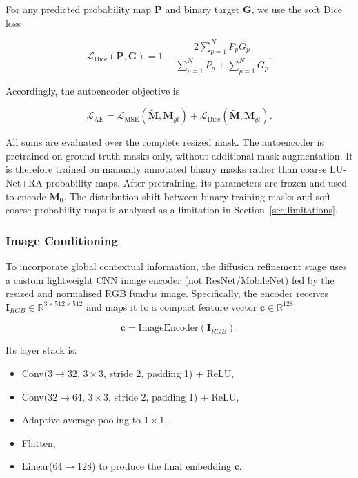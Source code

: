 \documentclass[jimaging,article,submit,pdftex,moreauthors]{Definitions/mdpi}%
\begin{document}
For any predicted probability map $\mathbf{P}$ and binary target $\mathbf{G}$, we use the soft Dice loss

\begin{equation}
\mathcal{L}_{\text{Dice}}(\mathbf{P},\mathbf{G})=
1-\frac{2\sum_{p=1}^{N}P_pG_p}
{\sum_{p=1}^{N}P_p+\sum_{p=1}^{N}G_p}.
\end{equation}

Accordingly, the autoencoder objective is

\begin{equation}
\mathcal{L}_{\text{AE}} =
\mathcal{L}_{\text{MSE}}(\tilde{\mathbf{M}},\mathbf{M}_{gt})+
\mathcal{L}_{\text{Dice}}(\tilde{\mathbf{M}},\mathbf{M}_{gt}).
\end{equation}

All sums are evaluated over the complete resized mask. The autoencoder is pretrained on ground-truth masks only, without additional mask augmentation. It is therefore trained on manually annotated binary masks rather than coarse LU-Net+RA probability maps. After pretraining, its parameters are frozen and used to encode $\mathbf{M}_0$. The distribution shift between binary training masks and soft coarse probability maps is analysed as a limitation in Section~\ref{sec:limitations}.



\subsubsection{Image Conditioning}



To incorporate global contextual information, the diffusion refinement stage uses a custom lightweight CNN image encoder (not ResNet/MobileNet) fed by the resized and normalised RGB fundus image. Specifically, the encoder receives $\mathbf{I}_{RGB}\in\mathbb{R}^{3\times512\times512}$ and maps it to a compact feature vector $\mathbf{c}\in\mathbb{R}^{128}$:

\begin{equation}
\mathbf{c}=\mathrm{ImageEncoder}(\mathbf{I}_{RGB}).
\end{equation}



Its layer stack is:

\begin{itemize}

  \item Conv($3\rightarrow32$, $3\times3$, stride 2, padding 1) + ReLU,

  \item Conv($32\rightarrow64$, $3\times3$, stride 2, padding 1) + ReLU,

  \item Adaptive average pooling to $1\times1$,

  \item Flatten,

  \item Linear($64\rightarrow128$) to produce the final embedding $\mathbf{c}$.

\end{itemize}
\end{document}
